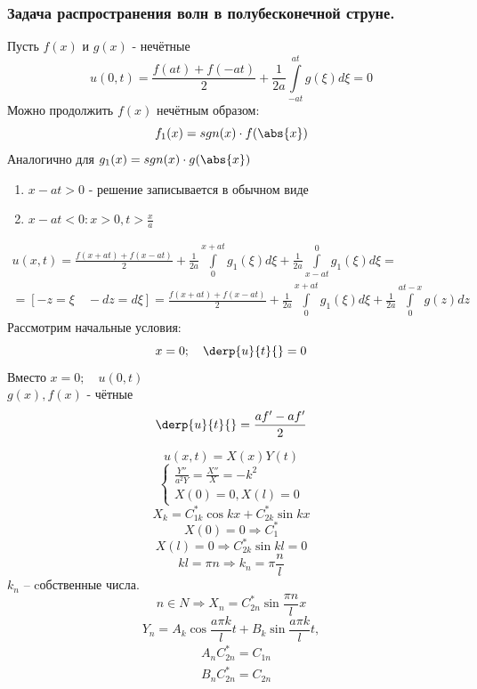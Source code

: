 \subsubsection{Задача распространения волн в полубесконечной струне.}
		Пусть $f(x)$ и $g(x)$ - нечётные
		\[
			u(0, t) = \frac{f(at) +f(-at)}{2} + \frac{1}{2a} \int\limits_{-at}^{at} g(\xi) d\xi = 0
		\]
		Можно продолжить $f(x)$ нечётным образом:
		\[
			f_1(x) = sgn(x) \cdot f(\abs{x})
		\]
		Аналогично для $g_1(x) = sgn (x) \cdot g(\abs{x})$
		\begin{enumerate}
			\item $x - at > 0$ - решение записывается в обычном виде\\
			\item $x - at < 0: x > 0, t > \frac{x}{a}$
		\end{enumerate}
		\begin{multline*}
			u(x, t) = \frac{f(x + at) + f(x - at)}{2} + \frac{1}{2a} \int\limits_0^{x +at} g_1(\xi) d \xi + \frac{1}{2 a} \int\limits_{x - at}^0 g_1 (\xi ) d\xi =\\= [-z = \xi \quad -dz = d\xi ] 
			= \frac{f(x + at) + f(x - at)}{2} +  \frac{1}{2a} \int\limits_0^{x +at} g_1(\xi) d \xi + \frac{1}{2 a} \int\limits_0^{at -x} g (z ) dz
		\end{multline*}
		Рассмотрим начальные условия: 
		\[
			x = 0; \quad \derp{u}{t}{} = 0
		\]
		Вместо $x = 0; \quad u(0, t)$\\
		$g(x), f(x)$ - чётные\\
		\[
			\derp{u}{t}{} = \frac{a f' - a f'}{2}
		\]

        \[
			u(x,t)= X(x) Y(t)
		\]
		\[
			\begin{cases}
				\frac{Y''}{a^2 Y} = \frac{X''}{X} = - k^2\\ 
				X(0) = 0, X(l) = 0
			\end{cases}
		\]
		\[
			X_k = C_{1k}^* \cos kx + C_{2k}^* \sin k x
		\]
		\[
			X(0) = 0 \Rightarrow C_1^*
		\]
		\[
			X(l) = 0 \Rightarrow C_{2k}^*\sin k l = 0
		\]
		\[
			k l=\pi n \Rightarrow k_n=\pi\frac{n}{l}
		\]
		$k_n$ -- cобственные числа.
	    \[
			n \in N \Rightarrow X_n= C_{2n}^* \sin \frac{\pi n}{l} x
		\]
		\[
			Y_n = A_k\cos \frac{a\pi k}{l} t + B_k \sin\frac{a\pi k}{l} t,
		\] 
		\begin{align*}
			&A_n C_{2n}^* =C_{1n}\\
			&B_n C_{2n}^* = C_{2n}
		\end{align*}
		
